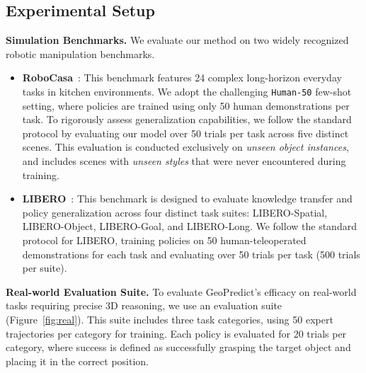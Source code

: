 \subsection{Experimental Setup} \label{sec:exp_setup}

\noindent \textbf{Simulation Benchmarks.}
We evaluate our method on two widely recognized robotic manipulation benchmarks.
\begin{itemize}[nolistsep, topsep=0pt, itemsep=1pt, parsep=0pt]
    \item \textbf{RoboCasa}~\cite{nasiriany2024robocasa}: This benchmark features 24 complex long-horizon everyday tasks in kitchen environments. We adopt the challenging \texttt{Human-50} few-shot setting, where policies are trained using only 50 human demonstrations per task. To rigorously assess generalization capabilities, we follow the standard protocol by evaluating our model over 50 trials per task across five distinct scenes. This evaluation is conducted exclusively on \textit{unseen object instances}, and includes scenes with \textit{unseen styles} that were never encountered during training.
    
    \item \textbf{LIBERO}~\cite{liu2023libero}: This benchmark is designed to evaluate knowledge transfer and policy generalization across four distinct task suites: LIBERO-Spatial, LIBERO-Object, LIBERO-Goal, and LIBERO-Long. We follow the standard protocol for LIBERO, training policies on 50 human-teleoperated demonstrations for each task and evaluating over 50 trials per task (500 trials per suite).
\end{itemize}


\noindent \textbf{Real-world Evaluation Suite.}
To evaluate GeoPredict's efficacy on real-world tasks requiring precise 3D reasoning, we use an evaluation suite (Figure~\ref{fig:real}). This suite includes three task categories, using 50 expert trajectories per category for training. Each policy is evaluated for 20 trials per category, where success is defined as successfully grasping the target object and placing it in the correct position.

